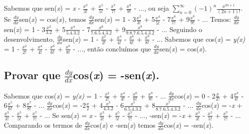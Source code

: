 Sabemos que sen(\textit{x}) = \textit{x} - $\frac{x^3}{3!}$ + $\frac{x^5}{5!}$ - $\frac{x^7}{7!}$ + $\frac{x^9}{9!}$ - ..., ou seja $\sum_{n=0}^{\infty}$$(-1)^{n}$$\frac{x^{2n + 1}}{(2n + 1)!}$.
\newline
Se $\frac{dy}{dx}$sen(\textit{x}) = cos(\textit{x}), temos $\frac{dy}{dx}$sen(\textit{x}) = 1 - 3$\frac{x^2}{3!}$ + 5$\frac{x^4}{5!}$ - 7$\frac{x^6}{7!}$ + 9$\frac{x^8}{9!}$ - ... 
\newline
Temos: $\frac{dy}{dx}$sen(\textit{x}) = 1 - 3$\frac{x^2}{3.2}$ + 5$\frac{x^4}{5.4.3.2}$ - 7$\frac{x^6}{7.6.5.4.3.2}$ + 9$\frac{x^8}{9.8.7.6.5.4.3.2}$ - ...
\newline
Seguindo o desenvolvimento, $\frac{dy}{dx}$sen(\textit{x}) = 1 - $\frac{x^2}{2!}$ + $\frac{x^4}{4!}$ - $\frac{x^6}{6!}$ + $\frac{x^8}{8!}$ - ...
\newline
Sabemos que cos(\textit{x}) = \textit{y(x)} = 1 - $\frac{x^2}{2!}$ + $\frac{x^4}{4!}$ - $\frac{x^6}{6!}$ + $\frac{x^8}{8!}$ - ..., então concluímos que  $\frac{dy}{dx}$sen(\textit{x}) = cos(\textit{x}).

\subsection{Provar que $\frac{dy}{dx}$cos(\textit{x}) = -sen(\textit{x}).}
Sabemos que cos(\textit{x}) = \textit{y(x)} = 1 - $\frac{x^2}{2!}$ + $\frac{x^4}{4!}$ - $\frac{x^6}{6!}$ + $\frac{x^8}{8!}$ - ...
\newline
$\frac{dy}{dx}$cos(\textit{x}) = 0 - 2$\frac{x}{2!}$ + 4$\frac{x^3}{4!}$ - 6$\frac{x^5}{6!}$ + 8$\frac{x^7}{8!}$ - ... 
\newline
$\frac{dy}{dx}$cos(\textit{x}) = -2$\frac{x}{2}$ + 4$\frac{x^3}{4.3.2}$ - 6$\frac{x^5}{6.5.4.3.2}$ + 8$\frac{x^7}{8.7.6.5.4.3.2}$ - ... 
\newline
$\frac{dy}{dx}$cos(\textit{x}) = -\textit{x} + $\frac{x^3}{3!}$ - $\frac{x^5}{5!}$ + $\frac{x^7}{7!}$ - ... 
\newline
Se sen(\textit{x}) = \textit{x} - $\frac{x^3}{3!}$ + $\frac{x^5}{5!}$ - $\frac{x^7}{7!}$ - ..., -sen(\textit{x}) = -\textit{x} + $\frac{x^3}{3!}$ - $\frac{x^5}{5!}$ + $\frac{x^7}{7!}$ - ...
\newline
Comparando os termos de $\frac{dy}{dx}$cos(\textit{x}) e -sen(\textit{x}) temos $\frac{dy}{dx}$cos(\textit{x}) = -sen(\textit{x}).